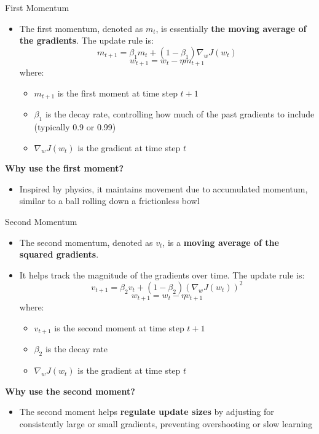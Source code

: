 \documentclass[serif, aspectratio=169]{beamer}
\begin{document}
\begin{frame}{First Momentum}
    \begin{itemize}
        \item The first momentum, denoted as $m_{t}$, is essentially \textbf{the moving average of the gradients}. The update rule is:
        \[m_{t+1} = \beta_1 m_t + (1 - \beta_1) \nabla_w J(w_t)\]
        \[w_{t+1} = w_t - \eta m_{t+1}\]
        where:
        \begin{itemize}
            \item $m_{t+1}$ is the first moment at time step $t+1$
            \item $\beta_1$ is the decay rate, controlling how much of the past gradients to include (typically 0.9 or 0.99)
            \item $\nabla_w J(w_t)$ is the gradient at time step $t$
        \end{itemize}
    \end{itemize}
    
    \textbf{Why use the first moment?}
    \begin{itemize}
        \item Inspired by physics, it maintains movement due to accumulated momentum, similar to a ball rolling down a frictionless bowl 
    \end{itemize}
\end{frame}

\begin{frame}{Second Momentum}
    \begin{itemize}
        \item The second momentum, denoted as $v_{t}$, is a \textbf{moving average of the squared gradients}. 
        \item It helps track the magnitude of the gradients over time. The update rule is:
        \[v_{t+1} = \beta_2 v_t + (1 - \beta_2) (\nabla_w J(w_t))^2\]
        \[w_{t+1} = w_t - \eta v_{t+1}\]
        where:
        \begin{itemize}
            \item $v_{t+1}$ is the second moment at time step $t+1$
            \item $\beta_2$ is the decay rate
            \item $\nabla_w J(w_t)$ is the gradient at time step $t$
        \end{itemize}
    \end{itemize}

    \textbf{Why use the second moment?}
    \begin{itemize}
        \item The second moment helps \textbf{regulate update sizes} by adjusting for consistently large or small gradients, preventing overshooting or slow learning
    \end{itemize}
\end{frame}
\end{document}
